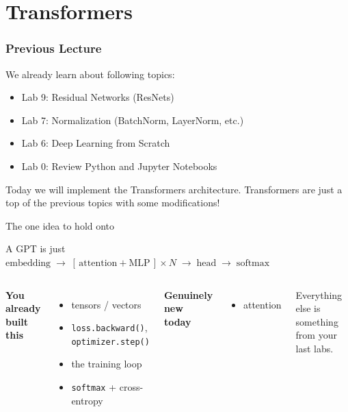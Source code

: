 \section{Transformers}

\begin{frame}
    \frametitle{Previous Lecture}
    
    We already learn about following topics:
    \begin{itemize}
        \item Lab 9: Residual Networks (ResNets)
        \item Lab 7: Normalization (BatchNorm, LayerNorm, etc.)
        \item Lab 6: Deep Learning from Scratch
        \item Lab 0: Review Python and Jupyter Notebooks
    \end{itemize}

    Today we will implement the Transformers architecture. Transformers are just a top of the previous topics with some modifications!
\end{frame}

\begin{frame}{The one idea to hold onto}
  \begin{center}
    \alert{A GPT is just}\\[2mm]
    \large $\text{embedding} \;\to\; [\,\text{attention} + \text{MLP}\,]\times N \;\to\; \text{head} \;\to\; \text{softmax}$
  \end{center}
  \vfill
  \begin{columns}[T]
      \textbf{You already built this}
      \begin{itemize}
        \item tensors / vectors
        \item \texttt{loss.backward()}, \texttt{optimizer.step()}
        \item the training loop
        \item \texttt{softmax} + cross-entropy
      \end{itemize}
      \textbf{Genuinely new today}
      \begin{itemize}
        \item[\textcolor{unistemerald}{$\bigstar$}] \alert{attention}
      \end{itemize}
      \vspace{4mm}
      {\footnotesize Everything else is something from your last labs.}
  \end{columns}
\end{frame}

